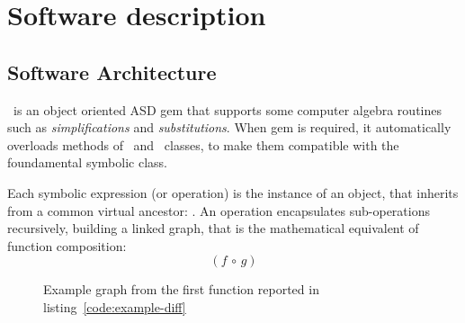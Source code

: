 \section{Software description}
\label{sec:description}


\subsection{Software Architecture}
\label{sec:architecture}


\ragnicas~is an object oriented ASD gem that supports some computer algebra routines such as \emph{simplifications} and \emph{substitutions}. When gem is required, it automatically overloads methods of \Fixnum~and \Float~classes, to make them compatible with the foundamental symbolic class.

Each symbolic expression (or operation) is the instance of an object, that inherits from a common virtual ancestor: \CASOp. An operation encapsulates sub-operations recursively, building a linked graph, that is the mathematical equivalent of function composition:
\begin{equation}
\left( f \, \circ \, g \right)
\end{equation}

\begin{figure}[ht!]
\label{fig:graph}
\centering

\caption{Example graph from the first function reported in listing~\ref{code:example-diff}}
\end{figure}

